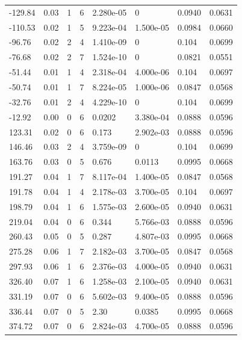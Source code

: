 \documentclass[preview]{standalone}
\begin{document}
{{\begin{tabular}{L{1.2cm}C{1.2cm} C{0.3cm}C{0.5cm} C{1.4cm}C{1.4cm} C{1.4cm}C{1.4cm}}
  -129.84  &  0.03  & 1     &  6 &  2.280e-05  & 0  & 0.0940 &  0.0631   \\ 
  -110.53  &  0.02  & 1     &  5 &  9.223e-04  & 1.500e-05  & 0.0984 &  0.0660   \\ 
  -96.76  &  0.02  & 2     &  4 &  1.410e-09  & 0  & 0.104 &  0.0699   \\ 
  -76.68  &  0.02  & 2     &  7 &  1.524e-10  & 0  & 0.0821 &  0.0551   \\ 
  -51.44  &  0.01  & 1     &  4 &  2.318e-04  & 4.000e-06  & 0.104 &  0.0697   \\ 
  -50.74  &  0.01  & 1     &  7 &  8.224e-05  & 1.000e-06  & 0.0847 &  0.0568   \\ 
  -32.76  &  0.01  & 2     &  4 &  4.229e-10  & 0  & 0.104 &  0.0699   \\ 
  -12.92  &  0.00  & 0     &  6 &  0.0202  & 3.380e-04  & 0.0888 &  0.0596   \\ 
  123.31  &  0.02  & 0     &  6 &  0.173  & 2.902e-03  & 0.0888 &  0.0596   \\ 
  146.46  &  0.03  & 2     &  4 &  3.759e-09  & 0  & 0.104 &  0.0699   \\ 
  163.76  &  0.03  & 0     &  5 &  0.676  & 0.0113  & 0.0995 &  0.0668   \\ 
  191.27  &  0.04  & 1     &  7 &  8.117e-04  & 1.400e-05  & 0.0847 &  0.0568   \\ 
  191.78  &  0.04  & 1     &  4 &  2.178e-03  & 3.700e-05  & 0.104 &  0.0697   \\ 
  198.79  &  0.04  & 1     &  6 &  1.575e-03  & 2.600e-05  & 0.0940 &  0.0631   \\ 
  219.04  &  0.04  & 0     &  6 &  0.344  & 5.766e-03  & 0.0888 &  0.0596   \\ 
  260.43  &  0.05  & 0     &  5 &  0.287  & 4.807e-03  & 0.0995 &  0.0668   \\ 
  275.28  &  0.06  & 1     &  7 &  2.182e-03  & 3.700e-05  & 0.0847 &  0.0568   \\ 
  297.93  &  0.06  & 1     &  6 &  2.376e-03  & 4.000e-05  & 0.0940 &  0.0631   \\ 
  326.40  &  0.07  & 1     &  6 &  1.258e-03  & 2.100e-05  & 0.0940 &  0.0631   \\ 
  331.19  &  0.07  & 0     &  6 &  5.602e-03  & 9.400e-05  & 0.0888 &  0.0596   \\ 
  336.44  &  0.07  & 0     &  5 &  2.30  & 0.0385  & 0.0995 &  0.0668   \\ 
  374.72  &  0.07  & 0     &  6 &  2.824e-03  & 4.700e-05  & 0.0888 &  0.0596   \\ 

\end{tabular}}}
\end{document}
